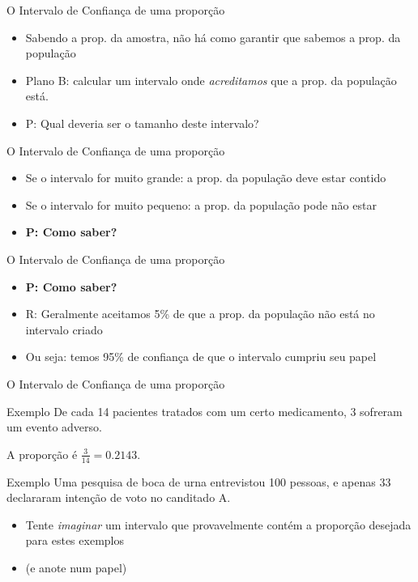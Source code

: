 \documentclass{beamer}
\begin{document}
\begin{frame}{O Intervalo de Confiança de uma proporção}
  \begin{itemize}
  \item Sabendo a prop. da amostra, não há como garantir que sabemos a prop. da população
  \item Plano B: calcular um intervalo onde {\em acreditamos} que a prop. da população está.
  \item P: Qual deveria ser o tamanho deste intervalo?
  \end{itemize}
\end{frame}

\begin{frame}{O Intervalo de Confiança de uma proporção}
  \begin{itemize}
  \item Se o intervalo for muito grande: a prop. da população deve estar contido
  \item Se o intervalo for muito pequeno: a prop. da população pode não estar
  \item {\bf P: Como saber?}
  \end{itemize}
\end{frame}

\begin{frame}{O Intervalo de Confiança de uma proporção}
  \begin{itemize}
  \item {\bf P: Como saber?}
  \item R: Geralmente aceitamos 5\% de que a prop. da população não está no intervalo criado
  \item Ou seja: temos \alert{95\% de confiança} de que o intervalo cumpriu seu papel
  \end{itemize}
\end{frame}

\begin{frame}{O Intervalo de Confiança de uma proporção}
  \begin{exampleblock}{Exemplo}
    De cada 14 pacientes tratados com um certo medicamento, 3 sofreram um evento adverso.

    A proporção é $\frac{3}{14} = 0.2143$.
  \end{exampleblock}
    \begin{exampleblock}{Exemplo}
    Uma pesquisa de boca de urna entrevistou 100 pessoas, e apenas 33 declararam intenção de voto no canditado A.

  \end{exampleblock}
  \begin{itemize}
    \item Tente {\em imaginar} um intervalo que \alert{provavelmente contém} a proporção desejada para estes exemplos
    \item (e anote num papel)
  \end{itemize}
\end{frame}
\end{document}
